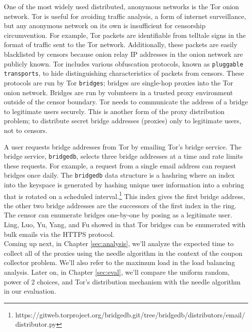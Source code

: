 One of the most widely used distributed, anonymous networks is the Tor onion network. Tor is useful for avoiding traffic analysis, a form of internet surveillance, but any anonymous network on its own is insufficient for censorship circumvention. For example, Tor packets are identifiable from telltale signs in the format of traffic sent to the Tor network. Additionally, these packets are easily blacklisted by censors because onion relay \ac{IP} addresses in the onion network are publicly known. Tor includes various obfuscation protocols, known as \texttt{pluggable transports}, to hide distinguishing characteristics of packets from censors. These protocols are run by Tor \texttt{bridges}; bridges are single-hop proxies into the Tor onion network. Bridges are run by volunteers in a trusted proxy environment outside of the censor boundary. Tor needs to communicate the address of a bridge to legitimate users securely. This is another form of the proxy distribution problem; to distribute secret bridge addresses (proxies) only to legitimate users, not to censors. 

A user requests bridge addresses from Tor by emailing Tor's bridge service. The bridge service, \texttt{bridgedb}, selects three bridge addresses at a time and rate limits these requests. For example, a request from a single email address can request bridges once daily. The \texttt{bridgedb} data structure is a hashring where an index into the keyspace is generated by hashing unique user information into a subring that is rotated on a scheduled interval.\footnote{https://gitweb.torproject.org/bridgedb.git/tree/bridgedb/distributors/email/distributor.py} This index gives the first bridge address, the other two bridge addresses are the successors of the first index in the ring. The censor can enumerate bridges one-by-one by posing as a legitimate user. Ling, Luo, Yu, Yang, and Fu showed in \cite{ling2015tor} that Tor bridges can be enumerated with bulk emails via the \ac{HTTPS} protocol.\\

Coming up next, in Chapter \ref{sec:analysis}, we'll analyze the expected time to collect all of the proxies using the needle algorithm in the context of the coupon collector problem. We'll also refer to the maximum load in the load balancing analysis. Later on, in Chapter \ref{sec:eval}, we'll compare the uniform random, power of 2 choices, and Tor's distribution mechanism with the needle algorithm in our evaluation.